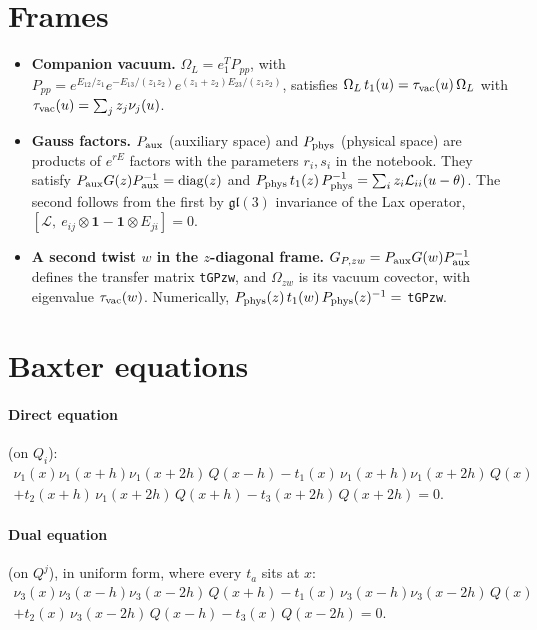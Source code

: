 \documentclass[11pt]{article}
\newcommand{\nb}[1]{\texttt{#1}}
\begin{document}
\section{Frames}\label{sec:frames}

\begin{itemize}
\item \textbf{Companion vacuum.} $\Omega_L=e_1^TP_{pp}$, with $P_{pp}=e^{E_{12}/z_1}e^{-E_{13}/(z_1z_2)}e^{(z_1+z_2)E_{23}/(z_1z_2)}$, satisfies $\Omega_L\,t_1(u)=\tau_{\rm vac}(u)\,\Omega_L$ with $\tau_{\rm vac}(u)=\sum_jz_j\nu_j(u)$.
\item \textbf{Gauss factors.} $P_{\rm aux}$ (auxiliary space) and $P_{\rm phys}$ (physical space) are products of $e^{rE}$ factors with the parameters $r_i,s_i$ in the notebook. They satisfy $P_{\rm aux}G(z)P_{\rm aux}^{-1}=\operatorname{diag}(z)$ and $P_{\rm phys}\,t_1(z)\,P_{\rm phys}^{-1}=\sum_iz_i\mathcal L_{ii}(u-\theta)$. The second follows from the first by $\mathfrak{gl}(3)$ invariance of the Lax operator, $[\mathcal L,\ e_{ij}\otimes\mathbf{1}-\mathbf{1}\otimes E_{ji}]=0$.
\item \textbf{A second twist $w$ in the $z$-diagonal frame.} $G_{P,zw}=P_{\rm aux}G(w)P_{\rm aux}^{-1}$ defines the transfer matrix \nb{tGPzw}, and $\Omega_{zw}$ is its vacuum covector, with eigenvalue $\tau_{\rm vac}(w)$. Numerically, $P_{\rm phys}(z)\,t_1(w)\,P_{\rm phys}(z)^{-1}=$ \nb{tGPzw}.
\end{itemize}

\section{Baxter equations}\label{sec:baxter}

\paragraph{Direct equation} (on $Q_i$):
\begin{multline}\label{eq:dir}
\nu_1(x)\nu_1(x+h)\nu_1(x+2h)\,Q(x-h)-t_1(x)\,\nu_1(x+h)\nu_1(x+2h)\,Q(x)\\
+t_2(x+h)\,\nu_1(x+2h)\,Q(x+h)-t_3(x+2h)\,Q(x+2h)=0 .
\end{multline}
\paragraph{Dual equation} (on $Q^j$), in uniform form, where every $t_a$ sits at $x$:
\begin{multline}\label{eq:dual}
\nu_3(x)\nu_3(x-h)\nu_3(x-2h)\,Q(x+h)-t_1(x)\,\nu_3(x-h)\nu_3(x-2h)\,Q(x)\\
+t_2(x)\,\nu_3(x-2h)\,Q(x-h)-t_3(x)\,Q(x-2h)=0 .
\end{multline}
\end{document}
